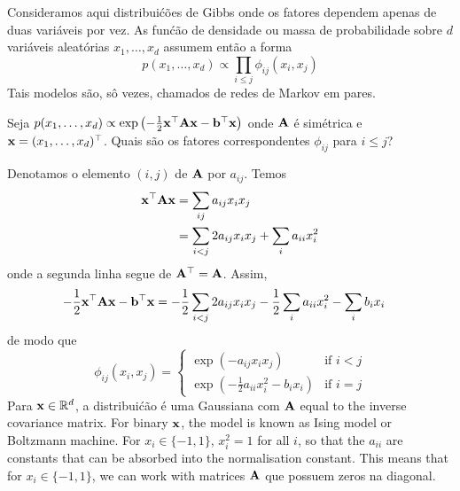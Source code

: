 
Consideramos aqui distribui\'c\~oes de Gibbs onde os fatores dependem apenas de duas vari\'aveis por vez.
As fun\'c\~ao de densidade ou massa de probabilidade sobre $d$ vari\'aveis aleat\'orias $x_1, \ldots, x_d$ assumem ent\~ao a forma
$$p(x_1, \ldots, x_d) \propto \prod_{i \le j} \phi_{ij}(x_i,x_j)$$
Tais modelos s\~ao, s\^o vezes, chamados de redes de Markov em pares.

\begin{exenumerate}
    
    \item Seja $p(x_1, \ldots, x_d) \propto \exp\left( -\frac{1}{2} \mathbf{x}^\top
    \mathbf{A} \mathbf{x} - \mathbf{b}^\top \mathbf{x} \right)$ onde $\mathbf{A}$ \'e sim\'etrica e $\mathbf{x} = (x_1,
    \ldots, x_d)^\top$. Quais s\~ao os fatores correspondentes $\phi_{ij}$
    para $i\le j$?
    \begin{solution}
        Denotamos o elemento $(i,j)$ de $\mathbf{A}$ por $a_{ij}$. Temos
        \begin{align}
            \mathbf{x}^\top \mathbf{A} \mathbf{x} & = \sum_{ij} a_{ij} x_i x_j \\
            &= \sum_{i<j} 2 a_{ij} x_i x_j + \sum_i a_{ii} x_i^2
        \end{align}
        onde a segunda linha segue de $\mathbf{A}^\top =\mathbf{A}$. Assim,
        \begin{align}
            -\frac{1}{2} \mathbf{x}^\top \mathbf{A} \mathbf{x} - \mathbf{b}^\top \mathbf{x} & = -\frac{1}{2} \sum_{i<j} 2a_{ij} x_i x_j - \frac{1}{2} \sum_i a_{ii} x_i^2 - \sum_i b_i x_i
        \end{align}
        de modo que
        \begin{equation}
            \phi_{ij}(x_i,x_j) = \begin{cases}
                \exp\left(- a_{ij} x_i x_j\right) & \text{if } i < j\\
                \exp\left( - \frac{1}{2} a_{ii} x_i^2 - b_i x_i\right) & \text{if } i=j
            \end{cases}
            \label{eq:pairwisepot-alt}
        \end{equation}
        Para $\mathbf{x} \in \mathbb{R}^d$, a distribui\'c\~ao \'e uma Gaussiana com $\mathbf{A}$
        equal to the inverse covariance matrix. For binary $\mathbf{x}$, the model is
        known as Ising model or Boltzmann machine. For $x_i \in \{-1,1\}$,
        $x_i^2=1$ for all $i$, so that the $a_{ii}$ are constants
        that can be absorbed into the normalisation constant. This means that
        for $x_i \in \{-1,1\}$, we can work with matrices $\mathbf{A}$ que possuem zeros
        na diagonal.
        

\end{solution}
\end{exenumerate}
